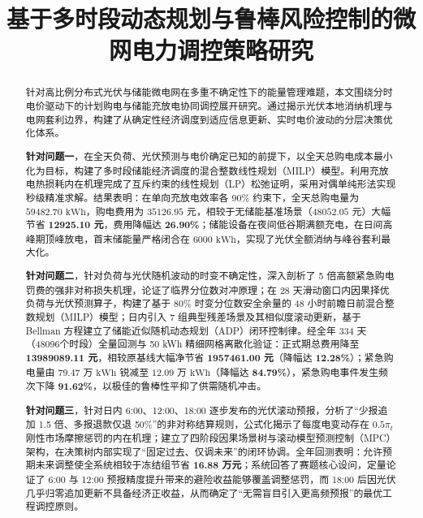 \documentclass[withoutpreface]{cumcmthesis}
\title{基于多时段动态规划与鲁棒风险控制的微网电力调控策略研究}
\begin{document}
\maketitle

\begin{abstract}
针对高比例分布式光伏与储能微电网在多重不确定性下的能量管理难题，本文围绕分时电价驱动下的计划购电与储能充放电协同调控展开研究。通过揭示光伏本地消纳机理与电网套利边界，构建了从确定性经济调度到适应信息更新、实时电价波动的分层决策优化体系。

\textbf{针对问题一}，在全天负荷、光伏预测与电价确定已知的前提下，以全天总购电成本最小化为目标，构建了多时段储能经济调度的混合整数线性规划（MILP）模型。利用充放电热损耗内在机理完成了互斥约束的线性规划（LP）松弛证明，采用对偶单纯形法实现秒级精准求解。结果表明：在单向充放电效率各 $90\%$ 约束下，全天总购电量为 $59482.70\text{ kWh}$，购电费用为 $35126.95\text{ 元}$，相较于无储能基准场景（$48052.05\text{ 元}$）大幅节省 \textbf{12925.10 元}，费用降幅达 \textbf{26.90\%}；储能设备在夜间低谷期满额充电，在日间高峰期顶峰放电，首末储能量严格闭合在 $6000\text{ kWh}$，实现了光伏全额消纳与峰谷套利最大化。

\textbf{针对问题二}，针对负荷与光伏随机波动的时变不确定性，深入剖析了 5 倍高额紧急购电罚费的强非对称损失机理，论证了临界分位数对冲原理；在 28 天滑动窗口内因果择优负荷与光伏预测算子，构建了基于 80\% 时变分位数安全余量的 48 小时前瞻日前混合整数规划（MILP）模型；日内引入 7 组典型残差场景及其相似度滚动更新，基于 Bellman 方程建立了储能近似随机动态规划（ADP）闭环控制律。经全年 334 天（48096个时段）全量回测与 50 kWh 精细网格离散化验证：正式期总费用降至 \textbf{13989089.11 元}，相较原基线大幅净节省 \textbf{1957461.00 元}（降幅达 \textbf{12.28\%}）；紧急购电量由 $79.47\text{ 万 kWh}$ 锐减至 $12.09\text{ 万 kWh}$（降幅达 \textbf{84.79\%}），紧急购电事件发生频次下降 \textbf{91.62\%}，以极佳的鲁棒性平抑了供需随机冲击。

\textbf{针对问题三}，针对日内 6:00、12:00、18:00 逐步发布的光伏滚动预报，分析了“少报追加 1.5 倍、多报退款仅退 50\%”的非对称结算规则，公式化揭示了每度电变动存在 $0.5\pi_t$ 刚性市场摩擦惩罚的内在机理；建立了四阶段因果场景树与滚动模型预测控制（MPC）架构，在决策树内部实现了“固定过去、仅调未来”的闭环协调。全年回测表明：允许预期未来调整使全系统相较于冻结组节省 \textbf{16.88 万元}；系统回答了赛题核心设问，定量论证了 6:00 与 12:00 预报精度提升带来的避险收益能够覆盖调整惩罚，而 18:00 后因光伏几乎归零追加更新不具备经济正收益，从而确定了“无需盲目引入更高频预报”的最优工程调控原则。


\end{abstract}
\end{document}
